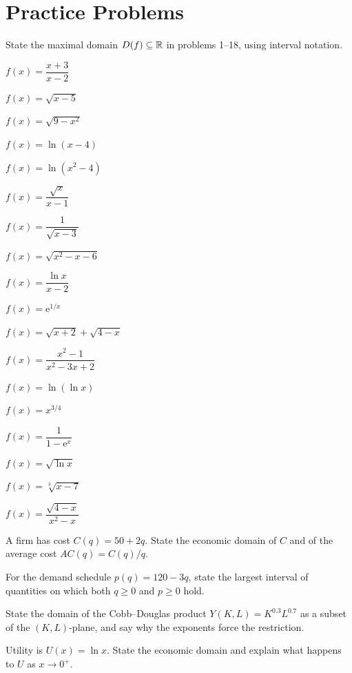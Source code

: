 \section{Practice Problems}

State the maximal domain $D(f)\subseteq\mathbb{R}$ in problems 1--18, using
interval notation.

\begin{problems}
  \item $f(x)=\dfrac{x+3}{x-2}$
  \item $f(x)=\sqrt{x-5}$
  \item $f(x)=\sqrt{9-x^{2}}$
  \item $f(x)=\ln(x-4)$
  \item $f(x)=\ln(x^{2}-4)$
  \item $f(x)=\dfrac{\sqrt{x}}{x-1}$
  \item $f(x)=\dfrac{1}{\sqrt{x-3}}$
  \item $f(x)=\sqrt{x^{2}-x-6}$
  \item $f(x)=\dfrac{\ln x}{x-2}$
  \item $f(x)=\mathrm{e}^{1/x}$
  \item $f(x)=\sqrt{x+2}+\sqrt{4-x}$
  \item $f(x)=\dfrac{x^{2}-1}{x^{2}-3x+2}$
  \item $f(x)=\ln(\ln x)$
  \item $f(x)=x^{3/4}$
  \item $f(x)=\dfrac{1}{1-\mathrm{e}^{x}}$
  \item $f(x)=\sqrt{\ln x}$
  \item $f(x)=\sqrt[3]{x-7}$
  \item $f(x)=\dfrac{\sqrt{4-x}}{x^{2}-x}$
\end{problems}

\begin{problems}[resume]
  \item A firm has cost $C(q)=50+2q$. State the economic domain of $C$
        and of the average cost $AC(q)=C(q)/q$.
  \item For the demand schedule $p(q)=120-3q$, state the largest interval
        of quantities on which both $q\geq0$ and $p\geq0$ hold.
  \item State the domain of the Cobb--Douglas product
        $Y(K,L)=K^{0.3}L^{0.7}$ as a subset of the $(K,L)$-plane, and say
        why the exponents force the restriction.
  \item Utility is $U(x)=\ln x$. State the economic domain and explain what
        happens to $U$ as $x\to 0^{+}$.
\end{problems}

